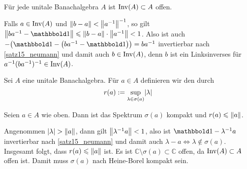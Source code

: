 \begin{korollar}[{name=[Invertierbare Elemente bilden offene Menge]},label=inv_offen]
	Für jede unitale Banachalgebra $A$ ist $\operatorname{Inv}(A) \subset A$ offen.
\end{korollar}
\begin{beweis}
	Falls $a \in \operatorname{Inv}(A)$ und $\norm{b-a} < \norm{a^{-1}}^{-1}$, so gilt $\norm{b a^{-1} -\ind} \le \norm{b-a} \cdot \norm{a^{-1}}<1$.  Also ist auch
	$-\enbrace*{\ind- \enbrace*{ba^{-1} -\ind}} = ba^{-1}$ invertierbar nach \autoref{satz15_neumann} und damit auch $b \in \operatorname{Inv}(A)$, denn $b$ ist ein Linksinverses für 
	$a^{-1}(ba^{-1})^{-1} \in \operatorname{Inv}(A)$.
\end{beweis}

\begin{definition}[{name=[Spektralradius]}]
	Sei $A$ eine unitale Banachalgebra. Für $a \in A$ definieren wir den  durch
	\[
		r(a) := \sup_{\lambda \in \sigma(a)} \lvert\lambda\rvert 
	\] 
\end{definition}

\begin{proposition}[{name=[Spektrum ist kompakt und Spektralradius durch Norm beschränkt]},label=spec_kompakt]
	Seien $a \in A$ wie oben. Dann ist das Spektrum $\sigma(a)$ kompakt und $r(a) \le \norm{a}$.
\end{proposition}
\begin{beweis}
	Angenommen $\abs{\lambda} > \norm{a}$, dann gilt $\norm{\lambda^{-1} a} < 1$, also ist $\ind- \lambda^{-1} a$ invertierbar nach \autoref{satz15_neumann} und 
	damit auch $\lambda -a \iff \lambda \notin \sigma(a)$. Insgesamt folgt, dass $r(a) \le \norm{a}$ ist. 	
	Es ist $\mathbb{C} \setminus \sigma(a) \subset \mathbb{C}$ offen, da $\operatorname{Inv}(A) \subset A$ offen ist. Damit muss $\sigma(a)$ nach Heine-Borel kompakt sein.
\end{beweis}

